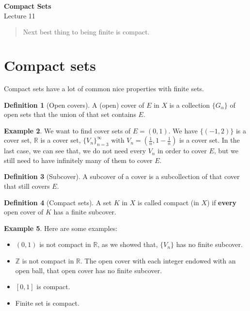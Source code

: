 \documentclass[12pt]{article}
\newcommand{\RR}{\mathbb{R}}   %
\newcommand{\ZZ}{\mathbb{Z}}   %
\theoremstyle{definition}
\newtheorem{definition}{Definition}[section]
\newtheorem{example}[definition]{Example}
\theoremstyle{plain}
\begin{document}

\begin{center}
    {\Large \textbf{Compact Sets}}\\[0.5em]
    {\large Lecture 11}
\end{center}

\tableofcontents

\newpage

\begin{quote}
Next best thing to being finite is compact.
\end{quote}
\section{Compact sets}

\begin{note}
Compact sets have a lot of common nice properties with finite sets.
\end{note}


\begin{definition}[Open covers]
A (open) cover of $E$ in $X$ is a collection $\{G_{\alpha}\}$ of open sets that the union of that set contains $E$.
\end{definition}

\begin{example}
We want to find cover sets of $E = (0, 1)$. We have $\{(-1,2)\}$ is a cover set, $\RR$ is a cover set, $\{V_n\}_{n=3}^{\infty} \text{ with } V_n = (\frac{1}{n}, 1-\frac{1}{n})$ is a cover set. In the last case, we can see that, we do not need every $V_n$ in order to cover $E$, but we still need to have infinitely many of them to cover $E$.
\end{example}

\begin{definition}[Subcover]
A subcover of a cover is a subcollection of that cover that still covers $E$.
\end{definition}

\begin{definition}[Compact sets]
A set $K$ in $X$ is called compact (in $X$) if \textbf{every} open cover of $K$ has a finite subcover.
\end{definition}

\begin{example}
Here are some examples:
\begin{itemize}
    \item $(0,1)$ is not compact in $\RR$, as we showed that, $\{V_n\}$ has no finite subcover.
    \item $\ZZ$ is not compact in $\RR$. The open cover with each integer endowed with an open ball, that open cover has no finite subcover.
    \item $[0,1]$ is compact.
    \item Finite set is compact.
\end{itemize}
\end{example}
\end{document}
